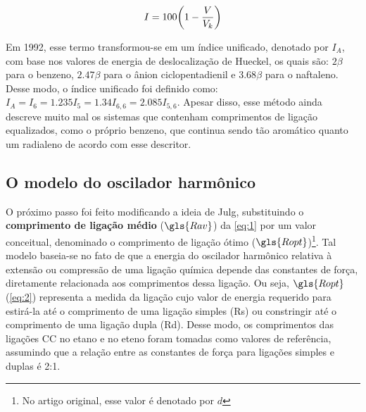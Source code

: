 \begin{figure}[htb]
    \vspace{1.0\baselineskip}
\begin{equation}
    I = 100 \bigg{(} 1 - \frac{V}{V_k} \bigg{)}
\end{equation}
\end{figure}

Em 1992, esse termo transformou-se em um índice unificado, denotado por $I_A$, com base nos valores de energia de deslocalização de Hueckel, os quais são: $2 \beta$ para o benzeno, $2.47 \beta$ para o ânion ciclopentadienil e $3.68 \beta$ para o naftaleno. Desse modo, o índice unificado foi definido como: $I_A = I_6 = 1.235 I_5 = 1.34 I_{6,6} = 2.085 I_{5,6}$. Apesar disso, esse método ainda descreve muito mal os sistemas que contenham comprimentos de ligação equalizados, como o próprio benzeno, que continua sendo tão aromático quanto um radialeno de acordo com esse descritor.

\subsection{O modelo do oscilador harmônico}\label{sec:HOMA}

O próximo passo foi feito modificando a ideia de Julg, substituindo o \textbf{comprimento de ligação médio} ($\gls{Rav}$) da \autoref{eq:1} por um valor conceitual, denominado o comprimento de ligação ótimo ($\gls{Ropt}$)\footnote{No artigo original\autocite{Kruszewski1972}, esse valor é denotado por $d$}. Tal modelo baseia-se no fato de que a energia do oscilador harmônico relativa à extensão ou compressão de uma ligação química depende das constantes de força, diretamente relacionada aos comprimentos dessa ligação. Ou seja, $\gls{Ropt}$ (\autoref{eq:2}) representa a medida da ligação cujo valor de energia requerido para estirá-la até o comprimento de uma ligação simples (\gls{Rs}) ou constringir até o comprimento de uma ligação dupla (\gls{Rd}). Desse modo, os comprimentos das ligações CC no etano e no eteno foram tomadas como valores de referência, assumindo que a relação entre as constantes de força para ligações simples e duplas é 2:1.

